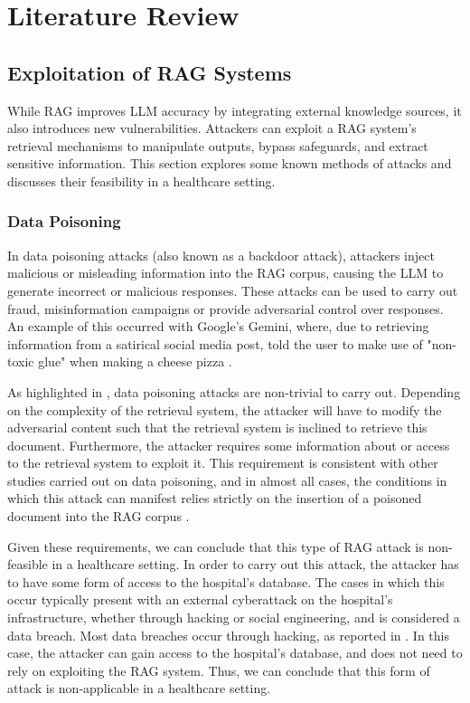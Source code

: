 \chapter{Literature Review} \label {literature}

\section{Exploitation of RAG Systems}

While RAG improves LLM accuracy by integrating external knowledge sources, it also introduces new vulnerabilities. Attackers can exploit a RAG system's retrieval mechanisms to manipulate outputs, bypass safeguards, and extract sensitive information. This section explores some known methods of attacks and discusses their feasibility in a healthcare setting.

\subsection{Data Poisoning}
In data poisoning attacks (also known as a backdoor attack), attackers inject malicious or misleading information into the RAG corpus, causing the LLM to generate incorrect or malicious responses. These attacks can be used to carry out fraud, misinformation campaigns or provide adversarial control over responses. An example of this occurred with Google's Gemini, where, due to retrieving information from a satirical social media post, told the user to make use of "non-toxic glue" when making a cheese pizza \autocite{McMahon_2024}.

As highlighted in \autocite{tan2024gluepizzaeatrocks}, data poisoning attacks are non-trivial to carry out.
Depending on the complexity of the retrieval system, the attacker will have to modify the adversarial content such that the retrieval system is inclined to retrieve this document.
Furthermore, the attacker requires some information about or access to the retrieval system to exploit it.
This requirement is consistent with other studies carried out on data poisoning, and in almost all cases, the conditions in which this attack can manifest relies strictly on the insertion of a poisoned document into the RAG corpus \autocite{xue2024badragidentifyingvulnerabilitiesretrieval, tan2024gluepizzaeatrocks, xian2024vulnerabilityapplyingretrievalaugmentedgeneration}.

Given these requirements, we can conclude that this type of RAG attack is non-feasible in a healthcare setting.
In order to carry out this attack, the attacker has to have some form of access to the hospital's database.
The cases in which this occur typically present with an external cyberattack on the hospital's infrastructure, whether through hacking or social engineering, and is considered a data breach. Most data breaches occur through hacking, as reported in \autocite{Alder_2025}.
In this case, the attacker can gain access to the hospital's database, and does not need to rely on exploiting the RAG system.
Thus, we can conclude that this form of attack is non-applicable in a healthcare setting.

